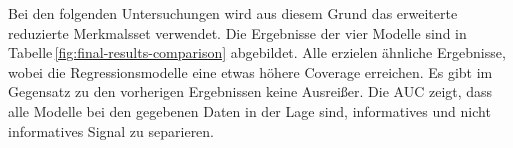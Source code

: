 Bei den folgenden Untersuchungen wird aus diesem Grund das erweiterte reduzierte Merkmalsset verwendet. Die Ergebnisse der vier Modelle sind in Tabelle\,\ref{fig:final-results-comparison} abgebildet. Alle erzielen ähnliche Ergebnisse, wobei die Regressionsmodelle eine etwas höhere Coverage erreichen. Es gibt im Gegensatz zu den vorherigen Ergebnissen keine Ausreißer. Die \ac{AUC} zeigt, dass alle Modelle bei den gegebenen Daten in der Lage sind, informatives und nicht informatives Signal zu separieren.

